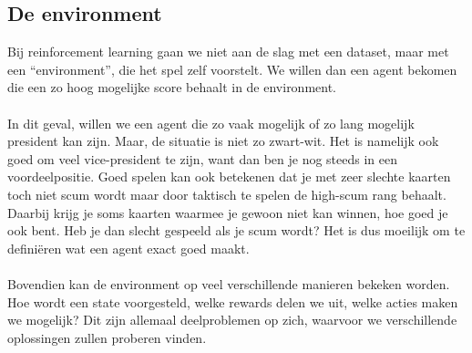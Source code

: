 \documentclass[11pt]{article}
\begin{document}
\subsection{De environment}
Bij reinforcement learning gaan we niet aan de slag met een dataset, maar met een “environment”, die het spel zelf voorstelt. We willen dan een agent bekomen die een zo hoog mogelijke score behaalt in de environment. \\\\
In dit geval, willen we een agent die zo vaak mogelijk of zo lang mogelijk president kan zijn. Maar, de situatie is niet zo zwart-wit. Het is namelijk ook goed om veel vice-president te zijn, want dan ben je nog steeds in een voordeelpositie. Goed spelen kan ook betekenen dat je met zeer slechte kaarten toch niet scum wordt maar door taktisch te spelen de high-scum rang behaalt. Daarbij krijg je soms kaarten waarmee je gewoon niet kan winnen, hoe goed je ook bent. Heb je dan slecht gespeeld als je scum wordt? Het is dus moeilijk om te definiëren wat een agent exact goed maakt. \\\\
Bovendien kan de environment op veel verschillende manieren bekeken worden. Hoe wordt een state voorgesteld, welke rewards delen we uit, welke acties maken we mogelijk? Dit zijn allemaal deelproblemen op zich, waarvoor we verschillende oplossingen zullen proberen vinden.
\end{document}
